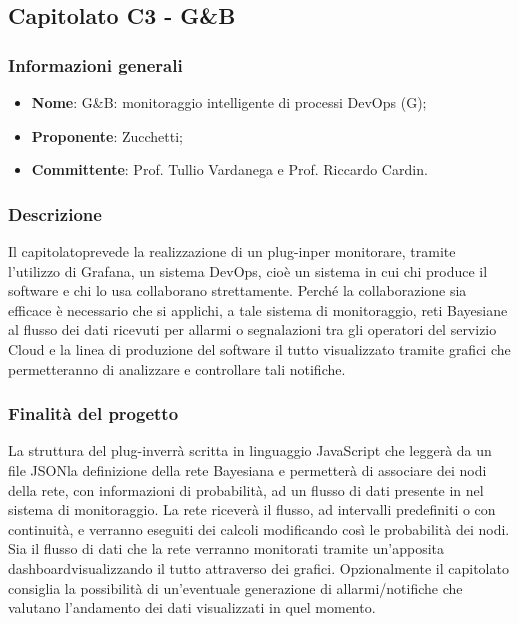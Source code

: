 \subsection{Capitolato C3 - G\&B}
\subsubsection{Informazioni generali}
\begin{itemize}
	\item \textbf{Nome}: G\&B: monitoraggio intelligente di processi DevOps (G);
	\item \textbf{Proponente}: Zucchetti;
	\item \textbf{Committente}: Prof. Tullio Vardanega e Prof. Riccardo Cardin.
\end{itemize}
\subsubsection{Descrizione}
Il capitolato\glo prevede la realizzazione di un plug-in\glo per monitorare, tramite l'utilizzo di Grafana\glo, un sistema DevOps\glo, cioè un sistema in cui chi produce il software e chi lo usa collaborano strettamente. Perché la collaborazione sia efficace è necessario che si applichi, a tale sistema di monitoraggio, reti Bayesiane al flusso dei dati ricevuti per allarmi o segnalazioni tra gli operatori del servizio Cloud e la linea di produzione del software il tutto visualizzato tramite grafici che permetteranno di analizzare e controllare tali notifiche.
\subsubsection{Finalità del progetto}
La struttura del plug-in\glo verrà scritta in linguaggio JavaScript che leggerà da un file JSON\glo la definizione della rete Bayesiana e permetterà di associare dei nodi della rete, con informazioni di probabilità, ad un flusso di dati presente in nel sistema di monitoraggio. La rete riceverà il flusso, ad intervalli predefiniti o con continuità, e verranno eseguiti dei calcoli modificando così le probabilità dei nodi. Sia il flusso di dati che la rete verranno monitorati tramite un'apposita dashboard\glo visualizzando il tutto attraverso dei grafici. Opzionalmente il capitolato consiglia la possibilità di	un'eventuale generazione di allarmi/notifiche che valutano l'andamento dei dati visualizzati in quel momento.
